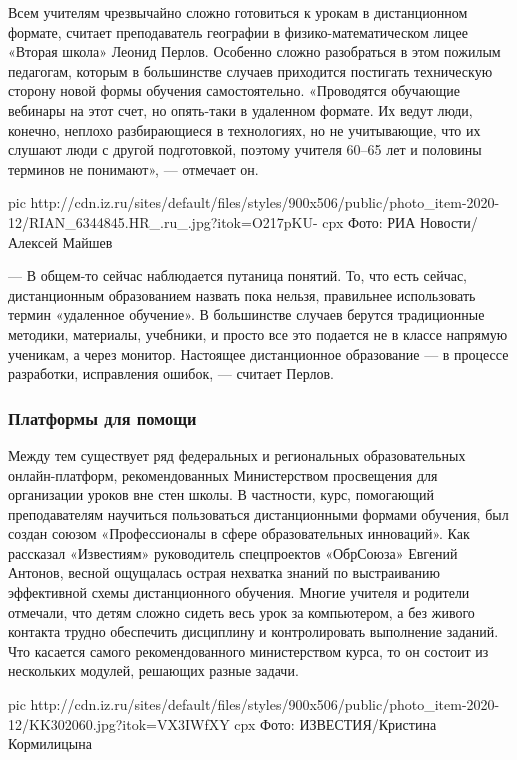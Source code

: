 Всем учителям чрезвычайно сложно готовиться к урокам в дистанционном формате,
считает преподаватель географии в физико-математическом лицее «Вторая школа»
Леонид Перлов. Особенно сложно разобраться в этом пожилым педагогам, которым в
большинстве случаев приходится постигать техническую сторону новой формы
обучения самостоятельно. «Проводятся обучающие вебинары на этот счет, но
опять-таки в удаленном формате. Их ведут люди, конечно, неплохо разбирающиеся в
технологиях, но не учитывающие, что их слушают люди с другой подготовкой,
поэтому учителя 60–65 лет и половины терминов не понимают», — отмечает он.

\ifcmt
pic http://cdn.iz.ru/sites/default/files/styles/900x506/public/photo_item-2020-12/RIAN_6344845.HR_.ru_.jpg?itok=O217pKU-
cpx Фото: РИА Новости/Алексей Майшев
\fi

— В общем-то сейчас наблюдается путаница понятий. То, что есть сейчас,
дистанционным образованием назвать пока нельзя, правильнее использовать термин
«удаленное обучение». В большинстве случаев берутся традиционные методики,
материалы, учебники, и просто все это подается не в классе напрямую ученикам, а
через монитор. Настоящее дистанционное образование — в процессе разработки,
исправления ошибок, — считает Перлов.

\subsubsection{Платформы для помощи}

Между тем существует ряд федеральных и региональных образовательных
онлайн-платформ, рекомендованных Министерством просвещения для организации
уроков вне стен школы. В частности, курс, помогающий преподавателям научиться
пользоваться дистанционными формами обучения, был создан союзом «Профессионалы
в сфере образовательных инноваций». Как рассказал «Известиям» руководитель
спецпроектов «ОбрСоюза» Евгений Антонов, весной ощущалась острая нехватка
знаний по выстраиванию эффективной схемы дистанционного обучения. Многие
учителя и родители отмечали, что детям сложно сидеть весь урок за компьютером,
а без живого контакта трудно обеспечить дисциплину и контролировать выполнение
заданий. Что касается самого рекомендованного министерством курса, то он
состоит из нескольких модулей, решающих разные задачи.

\ifcmt
pic http://cdn.iz.ru/sites/default/files/styles/900x506/public/photo_item-2020-12/KK302060.jpg?itok=VX3IWfXY
cpx Фото: ИЗВЕСТИЯ/Кристина Кормилицына
\fi

